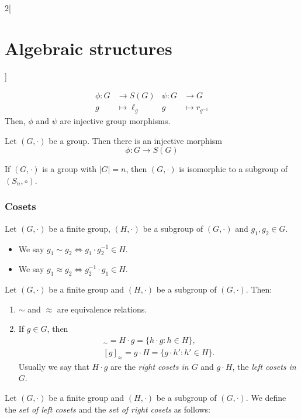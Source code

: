 \documentclass[../../../main.tex]{subfiles}
\begin{document}
\begin{multicols}{2}[\section{Algebraic structures}]
\begin{prop}
    \begin{align*}
        \phi:G&\longrightarrow S(G)&\psi:G&\longrightarrow G\\
        g&\longmapsto \ell_g &g&\longmapsto r_{g^{-1}}
    \end{align*}
    Then, $\phi$ and $\psi$ are injective group morphisms.
\end{prop}
\begin{theorem}
    Let $(G,\cdot)$ be a group. Then there is an injective morphism $$\phi:G\longrightarrow S(G)$$
\end{theorem}
\begin{corollary}
    If $(G,\cdot)$ is a group with $|G|=n$, then $(G,\cdot)$ is isomorphic to a subgroup of $(S_n,\circ)$.
\end{corollary}
\subsubsection*{Cosets}
\begin{definition}\label{AS_equiv} 
    Let $(G,\cdot)$ be a finite group, $(H,\cdot)$ be a subgroup of $(G,\cdot)$ and $g_1,g_2\in G$. 
    \begin{itemize}
        \item We say $g_1\sim g_2\iff g_1\cdot g_2^{-1}\in H$.
        \item We say $g_1\approx g_2\iff g_2^{-1}\cdot g_1\in H$.
    \end{itemize}
\end{definition}
\begin{lemma}
    Let $(G,\cdot)$ be a finite group and $(H,\cdot)$ be a subgroup of $(G,\cdot)$. Then:
    \begin{enumerate}
        \item $\sim$ and $\approx$ are equivalence relations.
        \item If $g\in G$, then 
        \begin{gather*}
            [g]_\sim=H\cdot g=\{h\cdot g:h\in H\},\\ [g]_\approx=g\cdot H=\{g\cdot h':h'\in H\}.
        \end{gather*}
        Usually we say that $H\cdot g$ are the \textit{right cosets in $G$} and $g\cdot H$, the \textit{left cosets in $G$}. 
    \end{enumerate}
\end{lemma}
\begin{definition}
    Let $(G,\cdot)$ be a finite group and $(H,\cdot)$ be a subgroup of $(G,\cdot)$. We define the \textit{set of left cosets} and the \textit{set of right cosets} as follows:

\end{definition}
\end{multicols}
\end{document}
